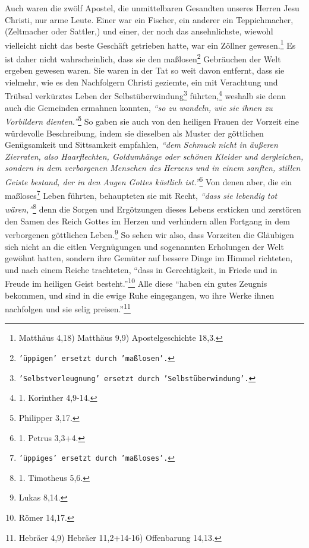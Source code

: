 Auch waren die zwölf Apostel, die unmittelbaren
Gesandten unseres Herren Jesu
Christi, nur arme Leute. Einer war ein Fischer, ein
anderer ein
Teppichmacher,
(Zeltmacher oder Sattler,) und einer, der noch das ansehnlichste, wiewohl
vielleicht nicht das beste Geschäft getrieben hatte, war ein
Zöllner
gewesen.\footnote{Matthäus 4,18) Matthäus 9,9) Apostelgeschichte 18,3.}
Es ist daher nicht wahrscheinlich, dass sie den
maßlosen\footnote{\texttt{'üppigen' ersetzt
durch 'maßlosen'.}} Gebräuchen der Welt ergeben
gewesen waren. Sie waren in der Tat so weit davon entfernt, dass sie vielmehr,
wie es den Nachfolgern Christi geziemte, ein mit Verachtung und Trübsal
verkürztes Leben der Selbstüberwindung\footnote{\texttt{'Selbstverleugnung'
ersetzt durch
'Selbstüberwindung'.}} führten,\footnote{1. Korinther 4,9-14.}
weshalb sie denn auch die Gemeinden ermahnen konnten,
\textit{"`so zu wandeln, wie sie ihnen zu Vorbildern
dienten."'}\footnote{Philipper 3,17.}
So gaben sie auch von den heiligen
Frauen der
Vorzeit
eine würdevolle Beschreibung, indem sie dieselben als Muster
der göttlichen Genügsamkeit und Sittsamkeit empfahlen,
\textit{"`dem Schmuck nicht in
äußeren Zierraten, also Haarflechten, Goldumhänge oder schönen Kleider und
dergleichen,
sondern in dem verborgenen Menschen des Herzens und in einem sanften, stillen
Geiste bestand, der in den Augen Gottes köstlich ist."'}\footnote{1. Petrus
3,3+4.}
Von denen aber, die ein maßloses\footnote{\texttt{'üppiges' ersetzt durch
'maßloses'.}} Leben
führten, behaupteten sie mit Recht,
\textit{"`dass sie lebendig tot wären,"'}\footnote{1.
Timotheus 5,6.}
denn die Sorgen und
Ergötzungen dieses Lebens ersticken und zerstören den Samen des Reich
Gottes im
Herzen und verhindern allen Fortgang in dem verborgenen göttlichen
Leben.\footnote{Lukas 8,14.}
So sehen wir also, dass Vorzeiten die Gläubigen sich
nicht an die eitlen Vergnügungen und sogenannten Erholungen der Welt gewöhnt
hatten, sondern ihre Gemüter auf bessere Dinge im Himmel
richteten, und nach
einem Reiche trachteten,
"`dass in Gerechtigkeit, in Friede und in Freude im
heiligen Geist besteht."'\footnote{Römer 14,17.}
Alle diese
"`haben ein gutes
Zeugnis bekommen, und sind in die ewige Ruhe eingegangen, wo ihre Werke ihnen
nachfolgen und sie selig preisen."'\footnote{Hebräer 4,9) Hebräer
11,2+14-16)
Offenbarung 14,13.}




